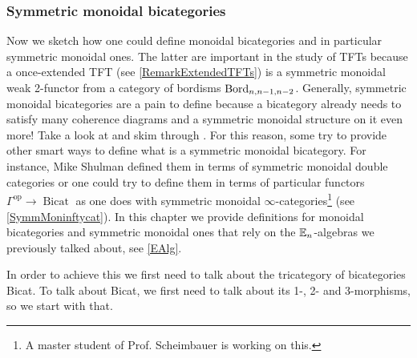 \subsubsection{Symmetric monoidal bicategories \extra}
Now we sketch how one could define monoidal bicategories and in particular symmetric monoidal ones.
 The latter are important in the study
of TFTs because a once-extended TFT (see \ref{RemarkExtendedTFTs}) is a symmetric monoidal
 weak 2-functor from a category of bordisms $\operatorname{Bord}_{n,n-1,n-2}$.
 Generally, symmetric monoidal bicategories are a pain to define because a bicategory already needs
 to satisfy many coherence diagrams and a symmetric monoidal structure on it even more! Take a look
 at \cite[Definition 2.3]{schommerpries2014classification} and skim through
  \cite[Section 2.3]{schommerpries2014classification}. For this reason, some try to provide other smart 
  ways to define what is a symmetric monoidal bicategory. For instance, Mike Shulman defined them 
  in terms of symmetric monoidal double categories \cite{shulman2010constructing} or one could try to
   define them 
  in terms of particular functors $\Gamma^{\operatorname{op}}\to \operatorname{Bicat}$ as one
  does with symmetric monoidal $\infty$-categories\footnote{A master student of Prof. Scheimbauer is
     working on this.} (see \ref{SymmMoninftycat}).%
     In this chapter we provide definitions for monoidal bicategories and symmetric
     monoidal ones that rely on the $\mathbb{E}_n$-algebras we previously talked about, see \ref{EAlg}.
     
     In order to achieve this we first need to talk about the tricategory of bicategories Bicat. 
     To talk about Bicat, we first need to talk about its 1-, 2- and 3-morphisms, so we start
     with that.
     
